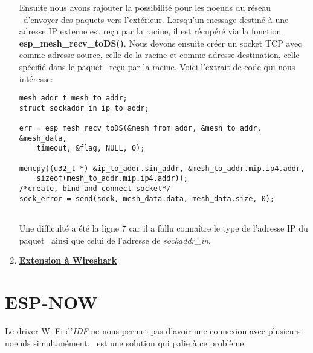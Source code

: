 \begin{enumerate}
            
            Ensuite nous avons rajouter la possibilité pour les noeuds du réseau \espmesh\ d'envoyer des paquets vers l'extérieur.
            Lorsqu'un message destiné à une adresse IP externe est reçu par la racine, il est récupéré via la fonction
            \textbf{esp\_mesh\_recv\_toDS()}. Nous devons ensuite créer un socket TCP avec comme adresse source, celle de la racine
            et comme adresse destination, celle spécifié dans le paquet \espmesh\ reçu par la racine.
            Voici l'extrait de code qui nous intéresse:
            \begin{verbatim}
mesh_addr_t mesh_to_addr;
struct sockaddr_in ip_to_addr;

err = esp_mesh_recv_toDS(&mesh_from_addr, &mesh_to_addr, &mesh_data, 
    timeout, &flag, NULL, 0);

memcpy((u32_t *) &ip_to_addr.sin_addr, &mesh_to_addr.mip.ip4.addr,
    sizeof(mesh_to_addr.mip.ip4.addr));
/*create, bind and connect socket*/
sock_error = send(sock, mesh_data.data, mesh_data.size, 0);
                
            \end{verbatim}
            Une difficulté a été la ligne 7 car il a fallu connaître le type de l'adresse IP du paquet \espmesh\ 
            ainsi que celui de l'adresse de \textit{sockaddr\_in}.

        
        \item \textbf{\underline{Extension à Wireshark}}\\
        
    \end{enumerate}

    \section{ESP-NOW}
        Le driver Wi-Fi d'\textit{IDF} ne nous permet pas d'avoir une connexion avec plusieurs noeuds simultanément. 
        \espnow\ est une solution qui palie à ce problème.\\